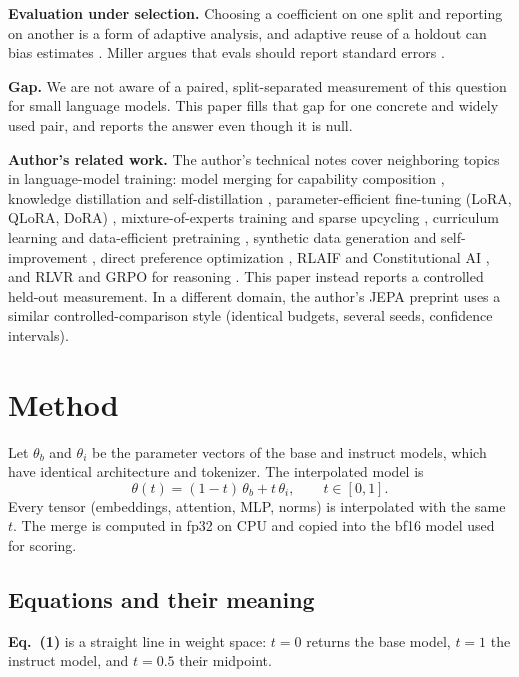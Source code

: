 \documentclass[conference]{IEEEtran}
\begin{document}
\textbf{Evaluation under selection.} Choosing a coefficient on one split and reporting on another is a form of adaptive analysis, and adaptive reuse of a holdout can bias estimates \cite{dwork2015adaptive}. Miller argues that evals should report standard errors \cite{miller2024errorbars}.

\textbf{Gap.} We are not aware of a paired, split-separated measurement of this question for small language models. This paper fills that gap for one concrete and widely used pair, and reports the answer even though it is null.

\textbf{Author's related work.} The author's technical notes cover neighboring topics in language-model training: model merging for capability composition \cite{santos2026modelmergingfo}, knowledge distillation and self-distillation \cite{santos2026knowledgedisti}, parameter-efficient fine-tuning (LoRA, QLoRA, DoRA) \cite{santos2026parametereffic}, mixture-of-experts training and sparse upcycling \cite{santos2026mixtureofexper}, curriculum learning and data-efficient pretraining \cite{santos2026curriculumlear}, synthetic data generation and self-improvement \cite{santos2026syntheticdatag}, direct preference optimization \cite{santos2026directpreferen}, RLAIF and Constitutional AI \cite{santos2026rlaifandconsti}, and RLVR and GRPO for reasoning \cite{santos2026reinforcementl}. This paper instead reports a controlled held-out measurement. In a different domain, the author's JEPA preprint \cite{santos2026collapseresist} uses a similar controlled-comparison style (identical budgets, several seeds, confidence intervals).

\section{Method}
Let $\theta_b$ and $\theta_i$ be the parameter vectors of the base and instruct models, which have identical architecture and tokenizer. The interpolated model is
\begin{equation}
\theta(t)=(1-t)\,\theta_b+t\,\theta_i,\qquad t\in[0,1].
\end{equation}
Every tensor (embeddings, attention, MLP, norms) is interpolated with the same $t$. The merge is computed in fp32 on CPU and copied into the bf16 model used for scoring.

\subsection*{Equations and their meaning}
\textbf{Eq.~(1)} is a straight line in weight space: $t=0$ returns the base model, $t=1$ the instruct model, and $t=0.5$ their midpoint.
\end{document}
